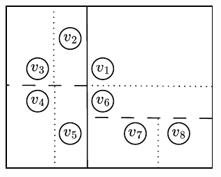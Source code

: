 \begin{figure}
\centering

\begin{minipage}{0.29\textwidth}
    \begin{subfigure}{\textwidth}
        \centering
        \includegraphics[width=\textwidth]{images/sfc_adaptive.svg.pdf}
        \caption{}
        \label{fig:sfc_adaptive}
    \end{subfigure}



\end{minipage}
\end{figure}
